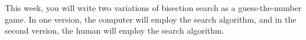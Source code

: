 \documentclass{article}
\begin{document}
This week, you will write two variations of bisection search as a guess-the-number game. In one version, the computer will employ the search algorithm, and in the second version, the human will employ the search algorithm.

%
%
%
%
%
\end{document}
